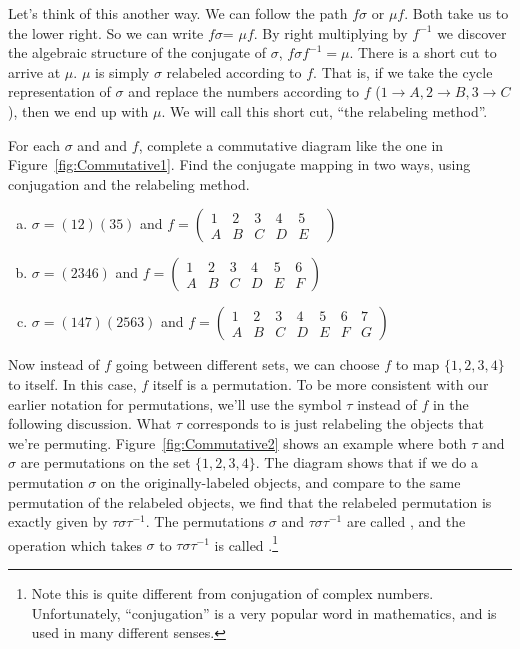 Let's think of this another way. We can follow the path $f\sigma$ or $\mu f$.  Both take us to the lower right. 
 So we can write $f\sigma$= $\mu f$. By right multiplying by $f^{-1}$ we discover the algebraic structure of the conjugate of $\sigma$,  $f\sigma f^{-1}=\mu$.  
There is a short cut to arrive at $\mu$.  $\mu$ is simply $\sigma$ relabeled according to $f$.  That is, if we take the cycle representation of $\sigma$ and replace the numbers according to $f$ ($1\rightarrow A, 2\rightarrow B, 3\rightarrow C$), then we end up with $\mu$.  We will call this short cut, ``the relabeling method''.

\begin{exercise}\label{exercise:actions:Conj1}
For each $\sigma$ and and $f$, complete a commutative diagram like the one in Figure~\ref{fig:Commutative1}. Find the conjugate mapping in two ways, using conjugation and the relabeling method.
\begin{enumerate}[(a)]
\item $\sigma=(12)(35)$ and $f=\begin{pmatrix} 1&2&3&4&5\\ A&B&C&D&E& \end{pmatrix} $
\item $\sigma=(2346)$ and $f=\begin{pmatrix} 1&2&3&4&5&6\\ A&B&C&D&E&F \end{pmatrix}$
\item $\sigma=(147)(2563)$ and $f=\begin{pmatrix} 1&2&3&4&5&6&7\\ A&B&C&D&E&F&G \end{pmatrix}$
\end{enumerate}
\end {exercise}
Now instead of $f$ going between different sets, we can choose $f$ to map $\{1,2,3,4\}$ to itself. In this case, $f$ itself is a permutation.  To be more consistent with our earlier notation for permutations, we'll use the symbol $\tau$ instead of $f$ in the following discussion.  What $\tau$ corresponds to is just relabeling the objects that we're permuting. Figure~\ref{fig:Commutative2} shows an example where both $\tau$ and $\sigma$ are permutations on the set $\{1,2,3,4\}$. The diagram shows that if we do a permutation $\sigma$ on the originally-labeled objects, and compare to the same permutation of the relabeled objects, we find that the relabeled permutation is exactly given by $\tau\sigma \tau^{-1}$. The permutations $\sigma$ and $\tau\sigma \tau^{-1}$ are called , and the operation which takes $\sigma$ to $\tau \sigma \tau^{-1}$ is called .\footnote{Note this is quite different from conjugation of complex numbers. Unfortunately, ``conjugation'' is a very popular word in mathematics, and is used in many different senses.}

